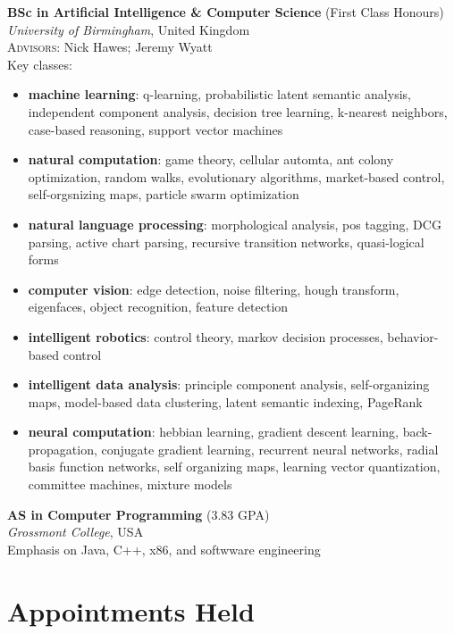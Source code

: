 \documentclass[10pt, a4paper]{article}
\newcommand{\years}[1]{\marginnote{\scriptsize #1}}
\begin{document}
\years{2012}
\textbf{BSc in Artificial Intelligence \& Computer Science} (First Class Honours)\\
\textsl{University of Birmingham}, United Kingdom\\
\small{\textsc{Advisors:} Nick Hawes; Jeremy Wyatt}\\[.2cm]
Key classes:
\begin{itemize}
\item \textbf{machine learning}: q-learning, probabilistic latent
  semantic analysis, independent component analysis, decision tree
  learning, k-nearest neighbors, case-based reasoning, support vector
  machines
\item \textbf{natural computation}: game theory, cellular automta, ant
  colony optimization, random walks, evolutionary algorithms,
  market-based control, self-orgsnizing maps, particle swarm
  optimization
\item \textbf{natural language processing}: morphological analysis,
  pos tagging, DCG parsing, active chart parsing, recursive transition
  networks, quasi-logical forms
\item \textbf{computer vision}: edge detection, noise filtering, hough
  transform, eigenfaces, object recognition, feature detection
\item \textbf{intelligent robotics}: control theory, markov decision
  processes, behavior-based control
\item \textbf{intelligent data analysis}: principle component
  analysis, self-organizing maps, model-based data clustering, latent
  semantic indexing, PageRank
\item \textbf{neural computation}: hebbian learning, gradient descent
  learning, back-propagation, conjugate gradient learning, recurrent
  neural networks, radial basis function networks, self organizing
  maps, learning vector quantization, committee machines, mixture
  models
\end{itemize}
\vspace{.25cm}

\years{2009}
\textbf{AS in Computer Programming} (3.83 GPA)\\
\textit{Grossmont College}, USA\\[.2cm]
Emphasis on Java, C++, x86, and softwware engineering

\section*{Appointments Held}
\end{document}
